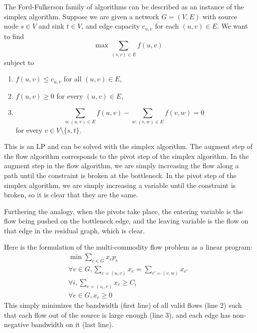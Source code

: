 \documentclass{article}
\newcommand{\problem}[1]{\noindent {\bf #1}}
\newcommand{\problempart}[1]{\noindent{\textbf{(#1)}}}
\begin{document}
\problem{Problem 1.}

The Ford-Fulkerson family of algorithms can be described as an instance of the simplex algorithm. Suppose we are given a network $G=(V,E)$ with source node $s\in V$ and sink $t\in V$, and edge capacity $c_{u,v}$ for each $(u,v)\in E$. We want to find
\[\max \sum_{(s,v)\in E} f(u,v)\]
subject to
\begin{enumerate}
\item $f(u,v)\leq c_{u,v}$ for all $(u,v)\in E$,
\item $f(u,v)\geq 0$ for every $(u,v)\in E$,
\item
\[\sum_{u:(u,v)\in E} f(u,v) - \sum_{w:(v,w)\in E} f(v,w) = 0\]
for every $v\in V\setminus\{s,t\}$.
\end{enumerate}

This is an LP and can be solved with the simplex algorithm. The augment step of the flow algorithm corresponds to the pivot step of the simplex algorithm. In the augment step in the flow algorithm, we are simply increasing the flow along a path until the constraint is broken at the bottleneck. In the pivot step of the simplex algorithm, we are simply increasing a variable until the constraint is broken, so it is clear that they are the same.

Furthering the analogy, when the pivots take place, the entering variable is the flow being pushed on the bottleneck edge, and the leaving variable is the flow on that edge in the residual graph, which is clear.

\problem{Problem 2.} 

\problempart{a} Here is the formulation of the multi-commodity flow problem as a linear program:
\begin{align*}
\min \sum_{e\in G} x_ep_e \\
\forall v \in G, \sum_{e = (u,v)} x_e = \sum_{e' = (v,w)} x_{e'} \\
\forall i, \sum_{e = (s_i, v)} x_e \geq C_i \\
\forall e \in G, x_e \geq 0
\end{align*}
This simply minimizes the bandwidth (first line) of all valid flows (line 2) such that each flow out of the source is large enough (line 3), and each edge has non-negative bandwidth on it (last line). 
\end{document}
